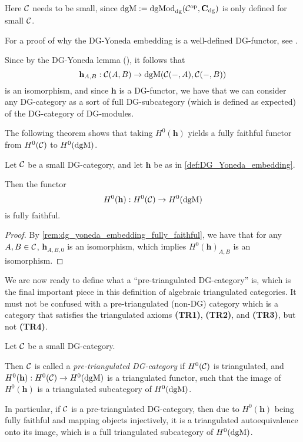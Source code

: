 Here \( {\mathcal{C}} \) needs to be small, since \( \operatorname{dgM} := \operatorname{dgMod}_{\operatorname{dg}}({\mathcal{C}}^{\operatorname{op}}, \operatorname{\mathbf{C}}_{\operatorname{dg}}) \) is only defined for small \( {\mathcal{C}} \).

For a proof of why the DG-Yoneda embedding is a well-defined DG-functor, see \cite[Corollary 6.3.6]{Borceux_1994}.

\begin{remark}
    \label{rem:dg_yoneda_embedding_fully_faithful}
    Since by the DG-Yoneda lemma (\cite[Corollary 6.3.5]{Borceux_1994}), it follows that
    \[
        \mathbf{h}_{A, B}: {\mathcal{C}}(A, B) \to \operatorname{dgM}({\mathcal{C}}(-, A), {\mathcal{C}}(-, B))
    \]
    is an isomorphism, and since \( \mathbf{h} \) is a DG-functor, we have that we can consider any DG-category as a sort of full DG-subcategory (which is defined as expected) of the DG-category of DG-modules.
\end{remark}

The following theorem shows that taking \( H^0(\mathbf{h}) \) yields a fully faithful functor from \( H^0({\mathcal{C}}) \) to \( H^0(\operatorname{dgM}) \).

\begin{lemma}
    Let \( {\mathcal{C}} \) be a small DG-category, and let \( \mathbf{h} \) be as in \autoref{def:DG_Yoneda_embedding}.

    Then the functor
    \[
        H^0(\mathbf{h}): H^0({\mathcal{C}}) \to H^0(\operatorname{dgM})
    \]
    is fully faithful.
\end{lemma}
\begin{proof}
    By \autoref{rem:dg_yoneda_embedding_fully_faithful}, we have that for any \( A, B \in {\mathcal{C}} \), \( \mathbf{h}_{A, B, 0} \) is an isomorphism, which implies \( H^0(\mathbf{h})_{A, B} \) is an isomorphism.
\end{proof}

We are now ready to define what a ``pre-triangulated DG-category'' is, which is the final important piece in this definition of algebraic triangulated categories. It must not be confused with a pre-triangulated (non-DG) category which is a category that satisfies the triangulated axioms {\bf (TR1)}, {\bf (TR2)}, and {\bf (TR3)}, but not {\bf (TR4)}.
\begin{definition}
    \label{def:pre-tri_dg_cat}
    Let \( {\mathcal{C}} \) be a small DG-category.

    Then \( {\mathcal{C}} \) is called a \emph{pre-triangulated DG-category} if \( H^0({\mathcal{C}}) \) is triangulated, and \( H^0(\mathbf{h}): H^0({\mathcal{C}}) \to H^0(\operatorname{dgM}) \) is a triangulated functor, such that the image of \( H^0(\mathbf{h}) \) is a triangulated subcategory of \( H^0(\operatorname{dgM}) \).
\end{definition}
In particular, if \( {\mathcal{C}} \) is a pre-triangulated DG-category, then due to \( H^0(\mathbf{h}) \) being fully faithful and mapping objects injectively, it is a triangulated autoequivalence onto its image, which is a full triangulated subcategory of \( H^0(\operatorname{dgM}) \).

